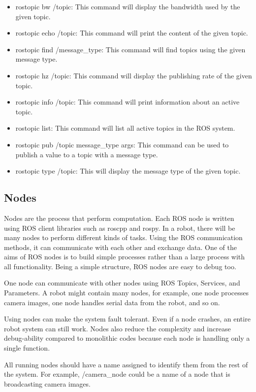  	\begin{itemize}
 		\item rostopic bw /topic: This command will display the bandwidth used by the given topic.
 		\item rostopic echo /topic: This command will print the content of the given topic. 
 		\item rostopic find /message\_type: This command will find topics using the given message type. 
 		\item rostopic hz /topic: This command will display the publishing rate of the given topic. 
 		\item rostopic info /topic: This command will print information about an active topic. 
 		\item rostopic list: This command will list all active topics in the ROS system. 
 		\item rostopic pub /topic message\_type args: This command can be used to publish a value to a topic with a message type.
 		\item rostopic type /topic: This will display the message type of the given topic.
 	\end{itemize}
 
 	\subsection{Nodes}
 	Nodes are the process that perform computation. Each ROS node is written using ROS client libraries such as roscpp and rospy. In a robot, there will be many nodes to perform different kinds of tasks. Using the ROS communication methods, it can communicate with each other and exchange data. One of the aims of ROS nodes is to build simple processes rather than a large process with all functionality. Being a simple structure, ROS nodes are easy to debug too.
 	
 	One node can communicate with other nodes using ROS Topics, Services, and Parameters. A robot might contain many nodes, for example, one node processes camera images, one node handles serial data from the robot, and so on.
 	
 	Using nodes can make the system fault tolerant. Even if a node crashes, an entire robot system can still work. Nodes also reduce the complexity and increase debug-ability compared to monolithic codes because each node is handling only a single function.
 	
 	All running nodes should have a name assigned to identify them from the rest of the system. For example, /camera\_node could be a name of a node that is broadcasting camera
 	images.
 	

